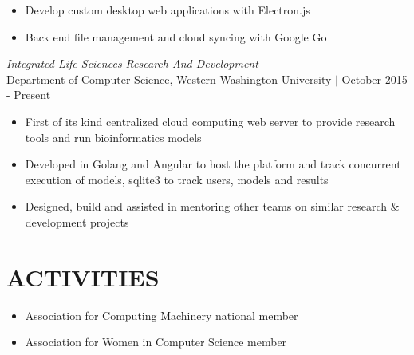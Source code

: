 \documentclass[line,margin]{res}
\begin{document}
\begin{resume}
\begin{itemize}
		\item Develop custom desktop web applications with Electron.js
		\item Back end file management and cloud syncing with Google Go
	\end{itemize}
	{\sl Integrated Life Sciences Research And Development} -- \\
	{\footnotesize Department of Computer Science, Western Washington University $|$ October 2015 - Present}
	\begin{itemize}\itemsep -2pt
		\item First of its kind centralized cloud computing web server to provide research tools and run bioinformatics models
		\item Developed in Golang and Angular to host the platform and track concurrent execution of models, sqlite3 to track users, models and results
		\item Designed, build and assisted in mentoring other teams on similar research \& development projects
	\end{itemize}

\section{ACTIVITIES}
	\begin{itemize} \itemsep -3pt
	\item Association for Computing Machinery national member
	\item Association for Women in Computer Science member
	\end{itemize}

\end{resume}
\end{document}
